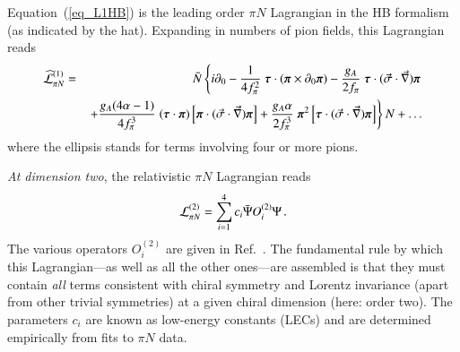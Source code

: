 \documentclass[sort&compress,preprint,3p]{elsarticle}
\begin{document}
Equation~(\ref{eq_L1HB}) is the leading order $\pi N$
Lagrangian in the HB formalism (as indicated by the hat).
Expanding in numbers of pion fields, 
this Lagrangian reads
\begin{eqnarray}
\widehat{\cal L}^{(1)}_{\pi N} 
& = & 
\bar{N} \left\{ 
i \partial_0 
- \frac{1}{4f_\pi^2} \;
\mbox{\boldmath $\tau$} \cdot 
 ( \mbox{\boldmath $\pi$}
\times
 \partial_0 \mbox{\boldmath $\pi$})
- \frac{g_A}{2f_\pi} \;
\mbox{\boldmath $\tau$} \cdot 
 ( \vec \sigma \cdot \vec \nabla )
\mbox{\boldmath $\pi$} 
\right. 
\nonumber \\ && 
\left.
+ \frac{g_A(4\alpha-1)}{4f_\pi^3} \;
(\mbox{\boldmath $\tau$} \cdot 
\mbox{\boldmath $\pi$}) 
\left[ \mbox{\boldmath $\pi$} \cdot 
 ( \vec \sigma \cdot \vec \nabla )
\mbox{\boldmath $\pi$} \right]
+ \frac{g_A\alpha}{2f_\pi^3} \;
\mbox{\boldmath $\pi$}^2 
\left[ \mbox{\boldmath $\tau$} \cdot 
 ( \vec \sigma \cdot \vec \nabla )
\mbox{\boldmath $\pi$} 
\right]
\right\} N 
+ \ldots
\label{eq_L1}
\end{eqnarray}
where the ellipsis stands for terms involving four
or more pions.

{\it At dimension two},
the relativistic $\pi N$ Lagrangian reads
\begin{equation}
{\cal L}^{(2)}_{\pi N} 
= \sum_{i=1}^{4} c_i \bar{\Psi} O^{(2)}_i \Psi \, .
\label{eq_L2rel}
\end{equation}
The various operators $O^{(2)}_i$ are given in Ref.~\cite{Fet00}.
The fundamental rule by which this Lagrangian---as well as all 
the other
ones---are assembled is that they must contain {\it all\/} terms
consistent with chiral symmetry and Lorentz invariance 
(apart from other trivial
symmetries) at a given chiral dimension (here: order two).
The parameters $c_i$ are known as low-energy constants (LECs)
and are determined empirically from fits to $\pi N$ data.
\end{document}
